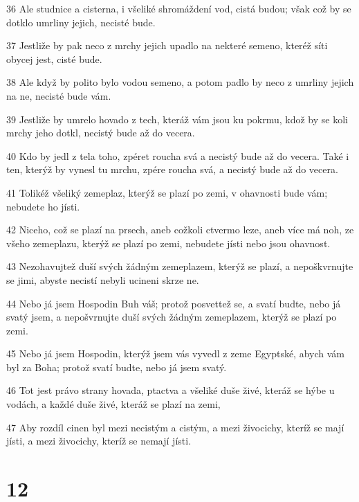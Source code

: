 \par 36 Ale studnice a cisterna, i všeliké shromáždení vod, cistá budou; však což by se dotklo umrliny jejich, necisté bude.
\par 37 Jestliže by pak neco z mrchy jejich upadlo na nekteré semeno, kteréž síti obycej jest, cisté bude.
\par 38 Ale když by polito bylo vodou semeno, a potom padlo by neco z umrliny jejich na ne, necisté bude vám.
\par 39 Jestliže by umrelo hovado z tech, kteráž vám jsou ku pokrmu, kdož by se koli mrchy jeho dotkl, necistý bude až do vecera.
\par 40 Kdo by jedl z tela toho, zpéret roucha svá a necistý bude až do vecera. Také i ten, kterýž by vynesl tu mrchu, zpére roucha svá, a necistý bude až do vecera.
\par 41 Tolikéž všeliký zemeplaz, kterýž se plazí po zemi, v ohavnosti bude vám; nebudete ho jísti.
\par 42 Niceho, což se plazí na prsech, aneb cožkoli ctvermo leze, aneb více má noh, ze všeho zemeplazu, kterýž se plazí po zemi, nebudete jísti nebo jsou ohavnost.
\par 43 Nezohavujtež duší svých žádným zemeplazem, kterýž se plazí, a nepoškvrnujte se jimi, abyste necistí nebyli ucineni skrze ne.
\par 44 Nebo já jsem Hospodin Buh váš; protož posvettež se, a svatí budte, nebo já svatý jsem, a nepošvrnujte duší svých žádným zemeplazem, kterýž se plazí po zemi.
\par 45 Nebo já jsem Hospodin, kterýž jsem vás vyvedl z zeme Egyptské, abych vám byl za Boha; protož svatí budte, nebo já jsem svatý.
\par 46 Tot jest právo strany hovada, ptactva a všeliké duše živé, kteráž se hýbe u vodách, a každé duše živé, kteráž se plazí na zemi,
\par 47 Aby rozdíl cinen byl mezi necistým a cistým, a mezi živocichy, kteríž se mají jísti, a mezi živocichy, kteríž se nemají jísti.

\chapter{12}

